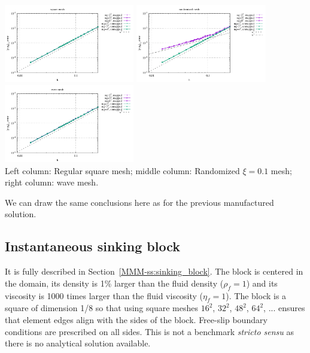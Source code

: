\begin{center}
\includegraphics[width=5.7cm]{python_codes/fieldstone_76/results/bench9/reg/errors_P}
\includegraphics[width=5.7cm]{python_codes/fieldstone_76/results/bench9/rand/errors_P}
\includegraphics[width=5.7cm]{python_codes/fieldstone_76/results/bench9/wave/errors_P}\\
{\captionfont Left column: Regular square mesh; middle column: Randomized $\xi=0.1$ mesh;
right column: wave mesh.}
\end{center}

We can draw the same conclusions here as for the previous manufactured solution.  


\newpage
\subsection*{Instantaneous sinking block}

It is fully described in Section~\ref{MMM-ss:sinking_block}.
The block is centered in the domain, its density is 1\% larger than the 
fluid density ($\rho_f=1$) and its viscosity is 1000 times larger than 
the fluid viscosity ($\eta_f=1$).
The block is a square of dimension 1/8 so that using square meshes $16^2$, 
$32^2$, $48^2$, $64^2$, ... ensures that element edges align with the 
sides of the block.
Free-slip boundary conditions are prescribed on all sides.
This is not a benchmark {\it stricto sensu} as there is no analytical solution
available. 

